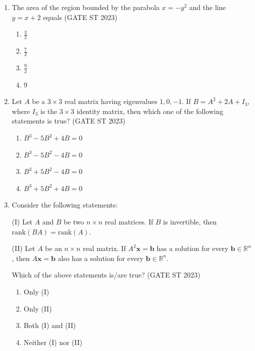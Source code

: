 \documentclass[journal]{IEEEtran}
\begin{document}
\begin{enumerate}[label=\textbf{Q.\arabic*.}, start=11, align=left, itemsep=2em]

\item The area of the region bounded by the parabola $x = -y^2$ and the line $y = x + 2$ equals \hfill(GATE ST 2023) 
\begin{enumerate}
    \item $\frac{3}{2}$
    \item $\frac{7}{2}$
    \item $\frac{9}{2}$
    \item $9$
\end{enumerate}

\item Let $A$ be a $3 \times 3$ real matrix having eigenvalues $1, 0, -1$. If $B = A^2 + 2A + I_3$, where $I_3$ is the $3\times 3$ identity matrix, then which one of the following statements is true? \hfill(GATE ST 2023) 
\begin{enumerate}
    \item $B^3 - 5B^2 + 4B = 0$
    \item $B^3 - 5B^2 - 4B = 0$
    \item $B^3 + 5B^2 - 4B = 0$
    \item $B^3 + 5B^2 + 4B = 0$
\end{enumerate}

\item Consider the following statements: 

(I) Let $A$ and $B$ be two $n\times n$ real matrices. If $B$ is invertible, then $\mathrm{rank}(BA) = \mathrm{rank}(A)$.

(II) Let $A$ be an $n\times n$ real matrix. If $A^2 \mathbf{x} = \mathbf{b}$ has a solution for every $\mathbf{b} \in \mathbb{R}^n$, then $A\mathbf{x} = \mathbf{b}$ also has a solution for every $\mathbf{b} \in \mathbb{R}^n$.

Which of the above statements is/are true? \hfill(GATE ST 2023) 
\begin{enumerate}
    \item Only (I)
    \item Only (II)
    \item Both (I) and (II)
    \item Neither (I) nor (II)
\end{enumerate}


\end{enumerate}
\end{document}
